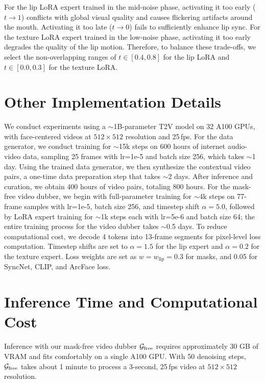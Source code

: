 For the lip LoRA expert trained in the mid-noise phase, activating it too early ($t\rightarrow1$) conflicts with global visual quality and causes flickering artifacts around the mouth. Activating it too late ($t\rightarrow0$) fails to sufficiently enhance lip sync. For the texture LoRA expert trained in the low-noise phase, activating it too early degrades the quality of the lip motion.
Therefore, to balance these trade-offs, we select the non-overlapping ranges of $t\in[0.4, 0.8]$ for the lip LoRA and $t\in[0.0, 0.3]$ for the texture LoRA.



\section{Other Implementation Details}
\label{appendix_sec:implementation_details}
We conduct experiments using a $\sim$1B-parameter T2V model on 32 A100 GPUs, with face-centered videos at $512\times512$ resolution and 25\,fps.
For the data generator, we conduct training for $\sim$15k steps on 600 hours of internet audio-video data, sampling 25 frames with lr=1e-5 and batch size 256, which takes $\sim$1 day.
Using the trained data generator, we then synthesize the contextual video pairs, a one-time data preparation step that takes $\sim$2 days.
After inference and curation, we obtain $400$ hours of video pairs, totaling 800 hours.
For the mask-free video dubber, we begin with full-parameter training for $\sim$4k steps on 77-frame samples with lr=1e-5, batch size 256, and timestep shift $\alpha=5.0$, followed by LoRA expert training for $\sim$1k steps each with lr=5e-6 and batch size 64; the entire training process for the video dubber takes $\sim$0.5 days.
To reduce computational cost, we decode 4 tokens into 13-frame segments for pixel-level loss computation.
Timestep shifts are set to $\alpha=1.5$ for the lip expert and $\alpha=0.2$ for the texture expert.
Loss weights are set as $w=w_{\text{lip}}=0.3$ for masks, and 0.05 for SyncNet, CLIP, and ArcFace loss.

\section{Inference Time and Computational Cost}
\label{appendix_sec:inference_cost}
Inference with our mask-free video dubber $\mathcal{G}_{\text{free}}$ requires approximately 30 GB of VRAM and fits comfortably on a single A100 GPU. With 50 denoising steps, $\mathcal{G}_{\text{free}}$ takes about 1 minute to process a 3-second, 25\,fps video at $512\times512$ resolution.

